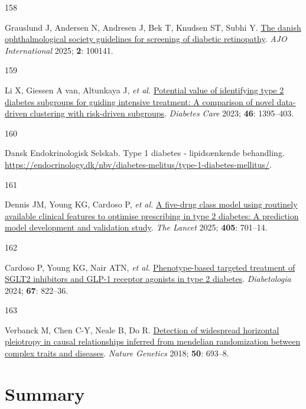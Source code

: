 \documentclass[
  letterpaper,
  headsepline=true,
  open=any]{scrbook}
\newlength{\cslhangindent}
\newlength{\csllabelwidth}
\newlength{\cslentryspacingunit} %
\newenvironment{CSLReferences}[2] %
 {%
  \setlength{\parindent}{0pt}
  \ifodd #1
  \let\oldpar\par
  \def\par{\hangindent=\cslhangindent\oldpar}
  \fi
  \setlength{\parskip}{#2\cslentryspacingunit}
 }%
 {}
\newcommand{\CSLLeftMargin}[1]{\parbox[t]{\csllabelwidth}{#1}}
\newcommand{\CSLRightInline}[1]{\parbox[t]{\linewidth - \csllabelwidth}{#1}\break}
\begin{document}
\begin{CSLReferences}{0}{0}
\leavevmode{}%
\CSLLeftMargin{158 }%
\CSLRightInline{Grauslund J, Andersen N, Andresen J, Bek T, Knudsen ST,
Subhi Y. \href{https://doi.org/10.1016/j.ajoint.2025.100141}{The danish
ophthalmological society guidelines for screening of diabetic
retinopathy}. \emph{AJO International} 2025; \textbf{2}: 100141.}

\leavevmode{}%
\CSLLeftMargin{159 }%
\CSLRightInline{Li X, Giessen A van, Altunkaya J, \emph{et al.}
\href{https://doi.org/10.2337/dc22-2170}{Potential value of identifying
type 2 diabetes subgroups for guiding intensive treatment: A comparison
of novel data-driven clustering with risk-driven subgroups}.
\emph{Diabetes Care} 2023; \textbf{46}: 1395--403.}

\leavevmode{}%
\CSLLeftMargin{160 }%
\CSLRightInline{Dansk Endokrinologisk Selskab. Type 1 diabetes -
lipidsænkende behandling.
\url{https://endocrinology.dk/nbv/diabetes-melitus/type-1-diabetes-mellitus/}.}

\leavevmode{}%
\CSLLeftMargin{161 }%
\CSLRightInline{Dennis JM, Young KG, Cardoso P, \emph{et al.}
\href{https://doi.org/10.1016/S0140-6736(24)02617-5}{A five-drug class
model using routinely available clinical features to optimise
prescribing in type 2 diabetes: A prediction model development and
validation study}. \emph{The Lancet} 2025; \textbf{405}: 701--14.}

\leavevmode{}%
\CSLLeftMargin{162 }%
\CSLRightInline{Cardoso P, Young KG, Nair ATN, \emph{et al.}
\href{https://doi.org/10.1007/s00125-024-06099-3}{Phenotype-based
targeted treatment of SGLT2 inhibitors and GLP-1 receptor agonists in
type 2 diabetes}. \emph{Diabetologia} 2024; \textbf{67}: 822--36.}

\leavevmode{}%
\CSLLeftMargin{163 }%
\CSLRightInline{Verbanck M, Chen C-Y, Neale B, Do R.
\href{https://doi.org/10.1038/s41588-018-0099-7}{Detection of widespread
horizontal pleiotropy in causal relationships inferred from mendelian
randomization between complex traits and diseases}. \emph{Nature
Genetics} 2018; \textbf{50}: 693--8.}

\end{CSLReferences}


\hypertarget{summary}{%
\chapter*{Summary}\label{summary}}
\end{document}
